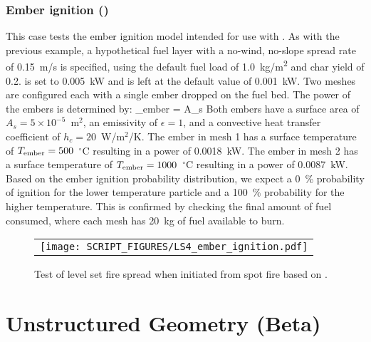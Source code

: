 \documentclass[11pt]{book}
\begin{document}
\subsection{Ember ignition (\texorpdfstring{}{LS4\_ember\_ignition})}
\label{LS4_ember_ignition}

This case tests the ember ignition model intended for use with . As with the previous example, a hypothetical fuel layer with a no-wind, no-slope spread rate of 0.15~m/s is specified, using the default fuel load of 1.0~\unit{kg/m^2} and char yield of 0.2.  is set to 0.005~kW and  is left at the default value of 0.001~kW. Two meshes are configured each with a single ember dropped on the fuel bed. The power of the embers is determined by:
\be
{}_{\rm ember} = A_s 
\ee
Both embers have a surface area of $A_s=5 \times 10^{-5}$~m$^2$, an emissivity of $\epsilon = 1$, and a convective heat transfer coefficient of $h_c = 20$~W/m$^2$/K. The ember in mesh 1 has a surface temperature of $T_{\rm ember} = 500$~$^\circ$C resulting in a power of 0.0018~kW. The ember in mesh 2 has a surface temperature of $T_{\rm ember} = 1000$~$^\circ$C resulting in a power of 0.0087~kW. Based on the ember ignition probability distribution, we expect a 0~\% probability of ignition for the lower temperature particle and a 100~\% probability for the higher temperature. This is confirmed by checking the final amount of fuel consumed, where each mesh has 20~kg of fuel available to burn.

\begin{figure}[h]
\begin{center}
\begin{tabular}{c}
 \texttt{[image: SCRIPT\_FIGURES/LS4\_ember\_ignition.pdf]}
\end{tabular}
\end{center}
 \caption[Level set ember ignition]{Test of level set fire spread when initiated from spot fire based on .}
\label{fig:LS4_ember_ignition}
\end{figure}


\ifcompgeom

\chapter{Unstructured Geometry (Beta)}
\end{document}

